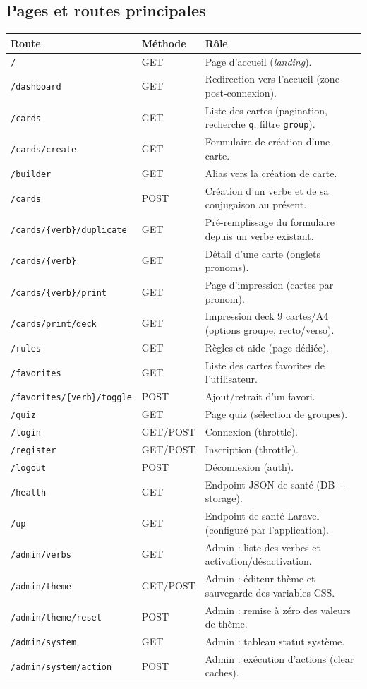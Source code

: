\documentclass[12pt,a4paper]{article}
\begin{document}
\subsection{Pages et routes principales}
\begin{longtable}{@{}p{4cm}p{3cm}p{7.5cm}@{}}
\toprule
\textbf{Route} & \textbf{Méthode} & \textbf{Rôle} \\
\midrule
\endhead
\texttt{/} & GET & Page d'accueil (\emph{landing}). \\
\texttt{/dashboard} & GET & Redirection vers l'accueil (zone post-connexion). \\
\texttt{/cards} & GET & Liste des cartes (pagination, recherche \texttt{q}, filtre \texttt{group}). \\
\texttt{/cards/create} & GET & Formulaire de création d'une carte. \\
\texttt{/builder} & GET & Alias vers la création de carte. \\
\texttt{/cards} & POST & Création d'un verbe et de sa conjugaison au présent. \\
\texttt{/cards/\{verb\}/duplicate} & GET & Pré-remplissage du formulaire depuis un verbe existant. \\
\texttt{/cards/\{verb\}} & GET & Détail d'une carte (onglets pronoms). \\
\texttt{/cards/\{verb\}/print} & GET & Page d'impression (cartes par pronom). \\
\texttt{/cards/print/deck} & GET & Impression deck 9 cartes/A4 (options groupe, recto/verso). \\
\texttt{/rules} & GET & Règles et aide (page dédiée). \\
\texttt{/favorites} & GET & Liste des cartes favorites de l'utilisateur. \\
\texttt{/favorites/\{verb\}/toggle} & POST & Ajout/retrait d'un favori. \\
\texttt{/quiz} & GET & Page quiz (sélection de groupes). \\
\texttt{/login} & GET/POST & Connexion (throttle). \\
\texttt{/register} & GET/POST & Inscription (throttle). \\
\texttt{/logout} & POST & Déconnexion (auth). \\
\texttt{/health} & GET & Endpoint JSON de santé (DB + storage). \\
\texttt{/up} & GET & Endpoint de santé Laravel (configuré par l'application). \\
\texttt{/admin/verbs} & GET & Admin : liste des verbes et activation/désactivation. \\
\texttt{/admin/theme} & GET/POST & Admin : éditeur thème et sauvegarde des variables CSS. \\
\texttt{/admin/theme/reset} & POST & Admin : remise à zéro des valeurs de thème. \\
\texttt{/admin/system} & GET & Admin : tableau statut système. \\
\texttt{/admin/system/action} & POST & Admin : exécution d'actions (clear caches). \\
\bottomrule
\end{longtable}
\end{document}
